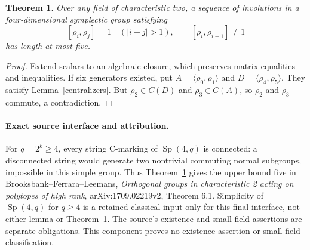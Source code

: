 \documentclass[11pt,a4paper]{article}
\newtheorem{theorem}[lemma]{Theorem}
\newcommand{\Sp}{\operatorname{Sp}}
\newcommand{\gen}[1]{\langle#1\rangle}
\begin{document}
\begin{theorem}\label{bound}
Over any field of characteristic two, a sequence of involutions in a
four-dimensional symplectic group satisfying
\[
 [\rho_i,\rho_j]=1\quad(|i-j|>1),\qquad
 [\rho_i,\rho_{i+1}]\ne1
\]
has length at most five.
\end{theorem}
\begin{proof}
Extend scalars to an algebraic closure, which preserves matrix equalities
and inequalities. If six generators existed, put
$A=\gen{\rho_0,\rho_1}$ and $D=\gen{\rho_4,\rho_5}$.
They satisfy Lemma~\ref{centralizers}.
But $\rho_2\in C(D)$ and $\rho_3\in C(A)$, so
$\rho_2$ and $\rho_3$ commute, a contradiction.
\end{proof}

\paragraph{Exact source interface and attribution.}
For $q=2^k\geq4$, every string C-marking of $\Sp(4,q)$ is connected:
a disconnected string would generate two nontrivial commuting normal
subgroups, impossible in this simple group. Thus Theorem~\ref{bound}
gives the upper bound five in Brooksbank--Ferrara--Leemans,
\emph{Orthogonal groups in characteristic 2 acting on polytopes of
high rank}, arXiv:1709.02219v2, Theorem 6.1.
Simplicity of $\Sp(4,q)$ for $q\geq4$ is a retained classical input
only for this final interface, not either lemma or Theorem~\ref{bound}.
The source's existence and small-field assertions are separate obligations.
This component proves no existence assertion or small-field classification.
\end{document}
